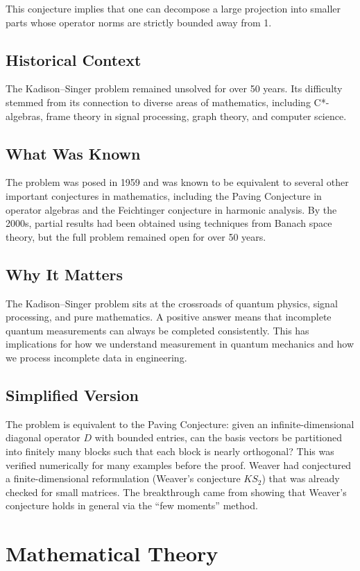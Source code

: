 This conjecture implies that one can decompose a large projection into smaller parts whose operator norms are strictly bounded away from 1.

\subsection{Historical Context}
The Kadison--Singer problem remained unsolved for over 50 years. Its difficulty stemmed from its connection to diverse areas of mathematics, including C*-algebras, frame theory in signal processing, graph theory, and computer science.

\subsection{What Was Known}
The problem was posed in 1959 and was known to be equivalent to several other important conjectures in mathematics, including the Paving Conjecture in operator algebras and the Feichtinger conjecture in harmonic analysis. By the 2000s, partial results had been obtained using techniques from Banach space theory, but the full problem remained open for over 50 years.

\subsection{Why It Matters}
The Kadison--Singer problem sits at the crossroads of quantum physics, signal processing, and pure mathematics. A positive answer means that incomplete quantum measurements can always be completed consistently. This has implications for how we understand measurement in quantum mechanics and how we process incomplete data in engineering.

\subsection{Simplified Version}
The problem is equivalent to the Paving Conjecture: given an infinite-dimensional diagonal operator $D$ with bounded entries, can the basis vectors be partitioned into finitely many blocks such that each block is nearly orthogonal? This was verified numerically for many examples before the proof. Weaver had conjectured a finite-dimensional reformulation (Weaver's conjecture $KS_2$) that was already checked for small matrices. The breakthrough came from showing that Weaver's conjecture holds in general via the ``few moments'' method.

\section{Mathematical Theory}


